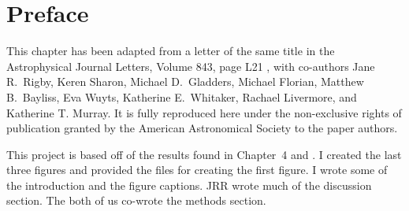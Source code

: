 \section{Preface}

This chapter has been adapted from a letter of the same title in the Astrophysical Journal Letters, Volume 843, page L21 \citep{Johnson:2017uq}, with co-authors Jane R.~Rigby, Keren Sharon, Michael D.~Gladders, Michael Florian, Matthew B.~Bayliss, Eva Wuyts, Katherine E.~Whitaker, Rachael Livermore, and Katherine T. Murray. It is fully reproduced here under the non-exclusive rights of publication granted by the American Astronomical Society to the paper authors.

This project is based off of the results found in Chapter~4 and \citet{Johnson:2017fj}. I created the last three figures and provided the files for creating the first figure. I wrote some of the introduction and the figure captions. JRR wrote much of the discussion section. The both of us co-wrote the methods section.



